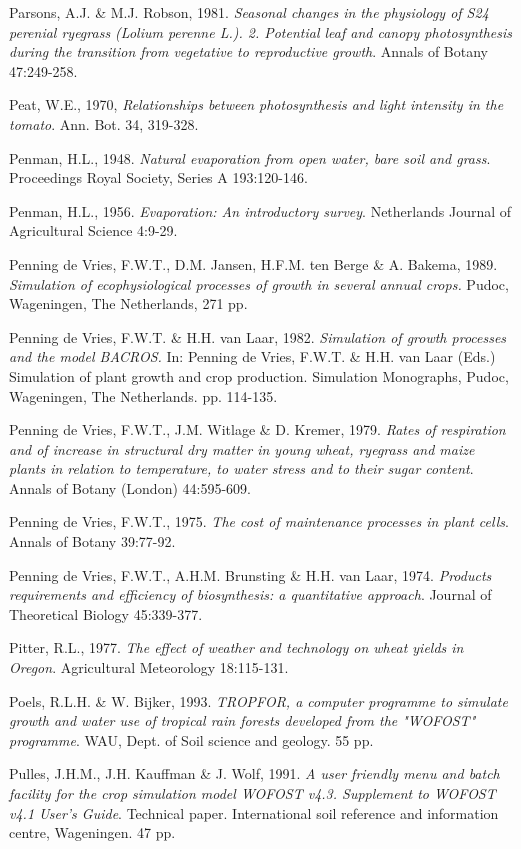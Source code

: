 Parsons, A.J. \& M.J. Robson, 1981. {\it Seasonal changes in the  physiology of S24 perenial ryegrass
(Lolium perenne L.). 2. Potential leaf and canopy photosynthesis during the transition from vegetative
to reproductive growth\/}. Annals of Botany 47:249-258.

Peat, W.E., 1970, {\it Relationships between photosynthesis and light intensity in the tomato\/}. Ann. Bot.
34, 319-328.

Penman, H.L., 1948. {\it Natural evaporation from open water, bare soil and grass\/}. Proceedings Royal
Society, Series A 193:120-146.

Penman, H.L., 1956. {\it Evaporation: An introductory survey\/}. Netherlands Journal of Agricultural
Science 4:9-29.

Penning de Vries, F.W.T., D.M. Jansen, H.F.M. ten Berge \& A. Bakema, 1989. {\it Simulation of
ecophysiological processes of growth in several annual crops.\/} Pudoc, Wageningen, The Netherlands,
271 pp.

Penning de Vries, F.W.T. \& H.H. van Laar, 1982. {\it Simulation of growth processes and the model
BACROS. \/}In: Penning de Vries, F.W.T. \& H.H. van Laar (Eds.) Simulation of plant growth and
crop production. Simulation Monographs, Pudoc, Wageningen, The Netherlands. pp. 114-135.

Penning de Vries, F.W.T., J.M. Witlage \& D. Kremer, 1979. {\it Rates of respiration and of increase
in structural dry matter in young wheat, ryegrass and maize plants in relation to temperature, to
water stress and to their sugar content\/}. Annals of Botany (London) 44:595-609.

Penning de Vries, F.W.T., 1975. {\it The cost of maintenance processes in plant cells\/}. Annals of Botany
39:77-92.

Penning de Vries, F.W.T., A.H.M. Brunsting \& H.H. van Laar, 1974. {\it Products requirements and
efficiency of biosynthesis: a quantitative approach\/}. Journal of Theoretical Biology 45:339-377.

Pitter, R.L., 1977. {\it The effect of weather and technology on wheat yields in Oregon\/}. Agricultural
Meteorology 18:115-131.

Poels, R.L.H. \& W. Bijker, 1993. {\it TROPFOR, a computer pro\-gramme to simulate growth and water
use of tropical rain forests developed from the "WOFOST" programme\/}. WAU, Dept. of Soil science
and geology. 55 pp.

Pulles, J.H.M., J.H. Kauffman \& J. Wolf, 1991. {\it A user {\nobreak}friendly menu and batch facility for the crop
simulation model WOFOST v4.3. Supplement to WOFOST v4.1 User's Guide\/}. Technical paper.
International soil reference and information centre, Wageningen. 47 pp.

